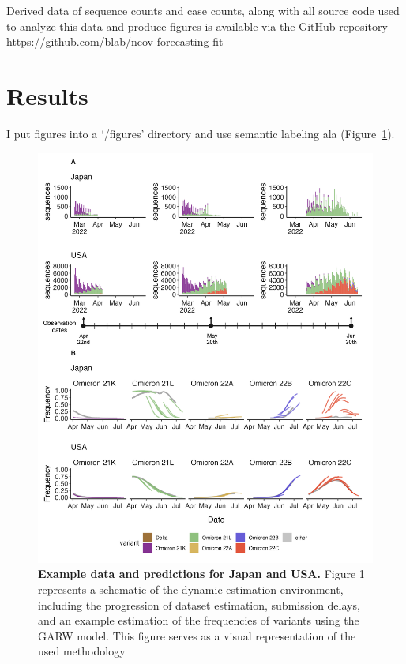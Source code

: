 \documentclass[11pt,oneside,letterpaper]{article}
\begin{document}
Derived data of sequence counts and case counts, along with all source code used to analyze
this data and produce figures is available via the GitHub repository https://github.com/blab/ncov-forecasting-fit





\section*{Results}

I put figures into a `/figures' directory and use semantic labeling ala (Figure~\ref{example_predictions}).

\begin{figure}[h]
	\centering
	\includegraphics[width=1.0\textwidth]{figures/example_predictions}
	\caption{\textbf{Example data and predictions for Japan and USA.}
	Figure 1 represents a schematic of the dynamic estimation environment, including the progression of dataset estimation, submission delays, and an example estimation of the frequencies of variants using the GARW model. This figure serves as a visual representation of the used methodology
	}
	\label{example_predictions}
\end{figure}
\end{document}
